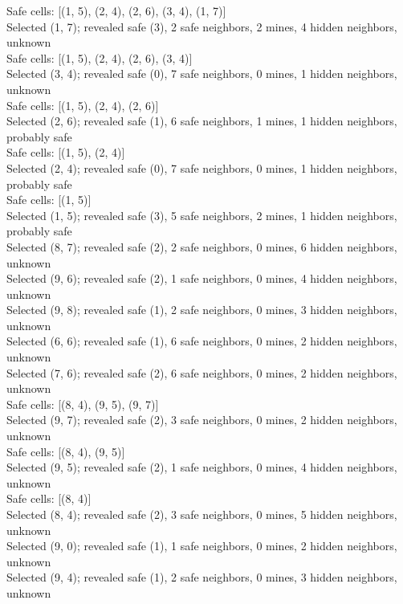 \documentclass[11pt]{article} %
\begin{document}
Safe cells: [(1, 5), (2, 4), (2, 6), (3, 4), (1, 7)]\\
Selected (1, 7); revealed safe (3), 2 safe neighbors, 2 mines, 4 hidden neighbors, unknown\\
Safe cells: [(1, 5), (2, 4), (2, 6), (3, 4)]\\
Selected (3, 4); revealed safe (0), 7 safe neighbors, 0 mines, 1 hidden neighbors, unknown\\
Safe cells: [(1, 5), (2, 4), (2, 6)]\\
Selected (2, 6); revealed safe (1), 6 safe neighbors, 1 mines, 1 hidden neighbors, probably safe\\
Safe cells: [(1, 5), (2, 4)]\\
Selected (2, 4); revealed safe (0), 7 safe neighbors, 0 mines, 1 hidden neighbors, probably safe\\
Safe cells: [(1, 5)]\\
Selected (1, 5); revealed safe (3), 5 safe neighbors, 2 mines, 1 hidden neighbors, probably safe\\
Selected (8, 7); revealed safe (2), 2 safe neighbors, 0 mines, 6 hidden neighbors, unknown\\
Selected (9, 6); revealed safe (2), 1 safe neighbors, 0 mines, 4 hidden neighbors, unknown\\
Selected (9, 8); revealed safe (1), 2 safe neighbors, 0 mines, 3 hidden neighbors, unknown\\
Selected (6, 6); revealed safe (1), 6 safe neighbors, 0 mines, 2 hidden neighbors, unknown\\
Selected (7, 6); revealed safe (2), 6 safe neighbors, 0 mines, 2 hidden neighbors, unknown\\
Safe cells: [(8, 4), (9, 5), (9, 7)]\\
Selected (9, 7); revealed safe (2), 3 safe neighbors, 0 mines, 2 hidden neighbors, unknown\\
Safe cells: [(8, 4), (9, 5)]\\
Selected (9, 5); revealed safe (2), 1 safe neighbors, 0 mines, 4 hidden neighbors, unknown\\
Safe cells: [(8, 4)]\\
Selected (8, 4); revealed safe (2), 3 safe neighbors, 0 mines, 5 hidden neighbors, unknown\\
Selected (9, 0); revealed safe (1), 1 safe neighbors, 0 mines, 2 hidden neighbors, unknown\\
Selected (9, 4); revealed safe (1), 2 safe neighbors, 0 mines, 3 hidden neighbors, unknown\\
\end{document}
